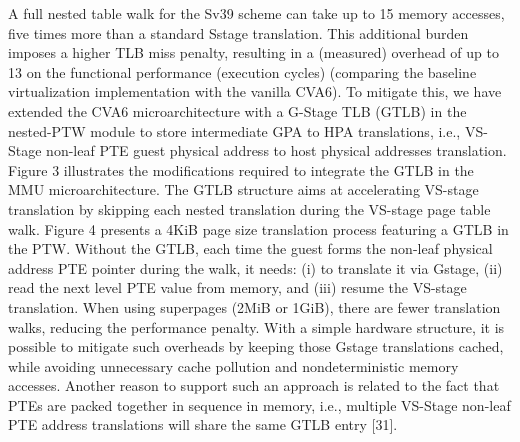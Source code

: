 A full nested table walk for the Sv39 scheme can take up
to 15 memory accesses, five times more than a standard Sstage translation. This additional burden imposes a higher TLB
miss penalty, resulting in a (measured) overhead of up to 13%
on the functional performance (execution cycles) (comparing
the baseline virtualization implementation with the vanilla
CVA6). To mitigate this, we have extended the CVA6 microarchitecture with a G-Stage TLB (GTLB) in the nested-PTW
module to store intermediate GPA to HPA translations, i.e.,
VS-Stage non-leaf PTE guest physical address to host physical
addresses translation. Figure 3 illustrates the modifications
required to integrate the GTLB in the MMU microarchitecture.
The GTLB structure aims at accelerating VS-stage translation
by skipping each nested translation during the VS-stage page
table walk. Figure 4 presents a 4KiB page size translation
process featuring a GTLB in the PTW. Without the GTLB,
each time the guest forms the non-leaf physical address PTE
pointer during the walk, it needs: (i) to translate it via Gstage, (ii) read the next level PTE value from memory, and
(iii) resume the VS-stage translation. When using superpages
(2MiB or 1GiB), there are fewer translation walks, reducing
the performance penalty. With a simple hardware structure, it
is possible to mitigate such overheads by keeping those Gstage translations cached, while avoiding unnecessary cache
pollution and nondeterministic memory accesses. Another
reason to support such an approach is related to the fact that
PTEs are packed together in sequence in memory, i.e., multiple
VS-Stage non-leaf PTE address translations will share the
same GTLB entry [31].




